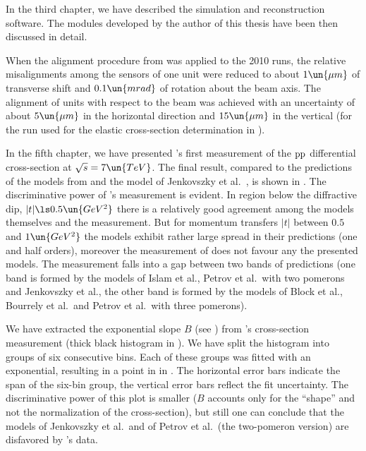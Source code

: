 In the third chapter, we have described the  simulation and reconstruction software. The modules developed by the author of this thesis have been then discussed in detail.

When the alignment procedure from  was applied to the 2010  runs, the relative misalignments among the sensors of one unit were reduced to about $1\un{\mu m}$ of transverse shift and $0.1\un{mrad}$ of rotation about the beam axis. The alignment of units with respect to the beam was achieved with an uncertainty of about $5\un{\mu m}$ in the horizontal direction and $15\un{\mu m}$ in the vertical (for the run used for the elastic cross-section determination in ).

In the fifth chapter, we have presented 's first measurement of the $\rm pp$ differential cross-section at $\sqrt s = 7\un{TeV}$. The final result, compared to the predictions of the models from  and the model of Jenkovszky et al.~, is shown in . The discriminative power of 's measurement is evident. In region below the diffractive dip, $|t| \ls 0.5\un{GeV^2}$ there is a relatively good agreement among the models themselves and the measurement. But for momentum transfers $|t|$ between $0.5$ and $1\un{GeV^2}$ the models exhibit rather large spread in their predictions (one and half orders), moreover the measurement of  does not favour any the presented models. The measurement falls into a gap between two bands of predictions (one band is formed by the models of Islam et al., Petrov et al.~with two pomerons and Jenkovszky et al., the other band is formed by the models of Block et al., Bourrely et al.~and Petrov et al.~with three pomerons).


We have extracted the exponential slope $B$ (see ) from 's cross-section measurement (thick black histogram in ). We have split the histogram into groups of six consecutive bins. Each of these groups was fitted with an exponential, resulting in a point in in . The horizontal error bars indicate the span of the six-bin group, the vertical error bars reflect the fit uncertainty. The discriminative power of this plot is smaller ($B$ accounts only for the ``shape'' and not the normalization of the cross-section), but still one can conclude that the models of Jenkovszky et al.~and of Petrov et al.~(the two-pomeron version) are disfavored by 's data.


